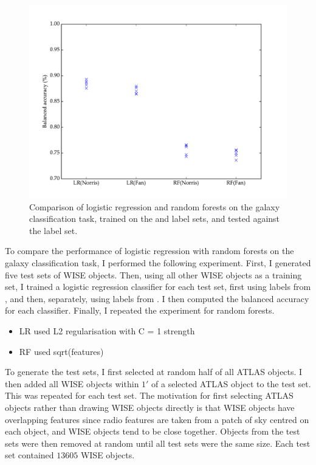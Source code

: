   \begin{figure}[!ht]
    \centering
    \includegraphics[width=\textwidth]{images/experiments/lr_rf}
    \caption{Comparison of logistic regression and random forests on the galaxy
      classification task, trained on the \citet{norris06} and \citet{fan15}
      label sets, and tested against the \citet{norris06} label set.}
  \end{figure}

  To compare the performance of logistic regression with random forests on the
  galaxy classification task, I performed the following experiment. First, I
  generated five test sets of WISE objects. Then, using all other WISE objects
  as a training set, I trained a logistic regression classifier for each test
  set, first using labels from \citet{norris06}, and then, separately, using
  labels from \citet{fan15}. I then computed the balanced accuracy for each
  classifier. Finally, I repeated the experiment for random forests.

  \begin{itemize}
    \item LR used L2 regularisation with C = 1 strength
    \item RF used sqrt(features)
  \end{itemize}

  To generate the test sets, I first selected at random half of all ATLAS
  objects. I then added all WISE objects within $1'$ of a selected ATLAS object
  to the test set. This was repeated for each test set. The motivation for first
  selecting ATLAS objects rather than drawing WISE objects directly is that WISE
  objects have overlapping features since radio features are taken from a patch
  of sky centred on each object, and WISE objects tend to be close together.
  Objects from the test sets were then removed at random until all test sets
  were the same size. Each test set contained $13605$ WISE objects.

